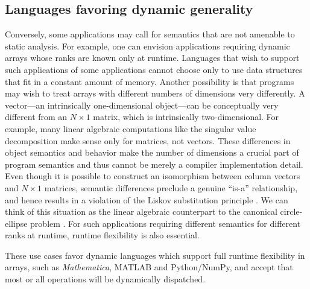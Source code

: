\documentclass[preprint]{sigplanconf}
\newcommand{\MATLAB}{\textsc{MATLAB}}
\newcommand{\Mathematica}{\textit{Mathematica}}
\begin{document}

\subsection{Languages favoring dynamic generality}

Conversely, some applications may call for semantics that are not amenable to
static analysis. For example, one can envision applications requiring dynamic
arrays whose ranks are known only at runtime. Languages that wish to support
such applications of some applications cannot choose only to use data
structures that fit in a constant amount of memory. Another possibility is
that programs may wish to treat arrays with different numbers of dimensions
very differently. A vector---an intrinsically one-dimensional object---can be
conceptually very different from an $N\times1$ matrix, which is intrinsically
two-dimensional. For example, many linear algebraic computations like the
singular value decomposition make sense only for matrices, not vectors. These
differences in object semantics and behavior make the number of dimensions a
crucial part of program semantics and thus cannot be merely a compiler
implementation detail. Even though it is possible to construct an isomorphism
between column vectors and $N\times1$ matrices, semantic differences preclude
a genuine ``is-a'' relationship, and hence results in a violation of the
Liskov substitution principle \cite{Liskov:1987da}. We can think of this
situation as the linear algebraic counterpart to the canonical circle-ellipse
problem \cite{Halbert:1987ut}. For such applications requiring different
semantics for different ranks at runtime, runtime flexibility is also essential.

These use cases favor dynamic languages which support full runtime
flexibility in arrays, such as \Mathematica{}, \MATLAB{} and Python/NumPy,
and accept that most or all operations will be dynamically dispatched.
\end{document}
